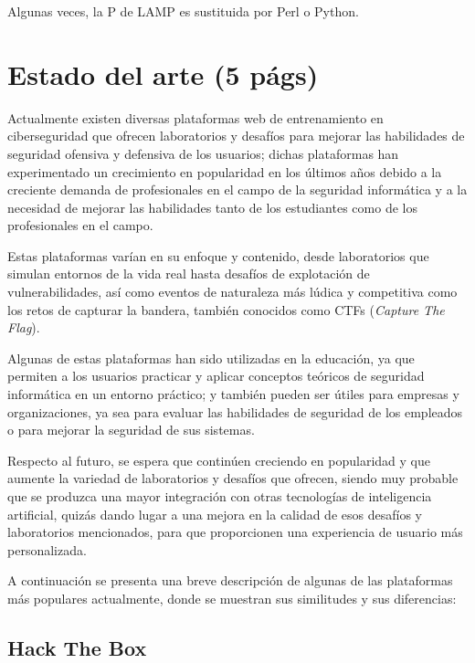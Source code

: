             Algunas veces, la P de LAMP es sustituida por Perl o Python.                  

            \cleardoublepage

    
     
\chapter{Estado del arte (5 págs)}
    \label{cap:estado-arte}

    Actualmente existen diversas plataformas web de entrenamiento en ciberseguridad que ofrecen laboratorios y desafíos para mejorar las habilidades de seguridad ofensiva y defensiva de los usuarios; dichas plataformas han experimentado un crecimiento en popularidad en los últimos años debido a la creciente demanda de profesionales en el campo de la seguridad informática y a la necesidad de mejorar las habilidades tanto de los estudiantes como de los profesionales en el campo.
    
    Estas plataformas varían en su enfoque y contenido, desde laboratorios que simulan entornos de la vida real hasta desafíos de explotación de vulnerabilidades, así como eventos de naturaleza más lúdica y competitiva como los retos de capturar la bandera, también conocidos como CTFs (\textit{Capture The Flag}).
    
    Algunas de estas plataformas han sido utilizadas en la educación, ya que permiten a los usuarios practicar y aplicar conceptos teóricos de seguridad informática en un entorno práctico; y también pueden ser útiles para empresas y organizaciones, ya sea para evaluar las habilidades de seguridad de los empleados o para mejorar la seguridad de sus sistemas.
    
    Respecto al futuro, se espera que continúen creciendo en popularidad y que aumente la variedad de laboratorios y desafíos que ofrecen, siendo muy probable que se produzca una mayor integración con otras tecnologías de inteligencia artificial, quizás dando lugar a una mejora en la calidad de esos desafíos y laboratorios mencionados, para que proporcionen una experiencia de usuario más personalizada.
    
    A continuación se presenta una breve descripción de algunas de las plataformas más populares actualmente, donde se muestran sus similitudes y sus diferencias:
    
    \newpage
    
    
    \section{Hack The Box}
    
